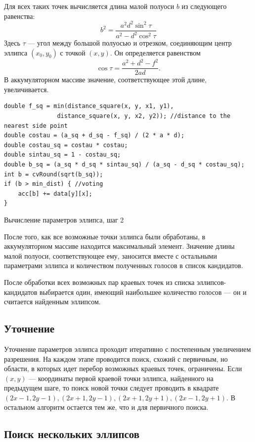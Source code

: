 Для всех таких точек вычисляется длина малой полуоси \(b\) из следующего равенства:
$$b^2 = \frac{a^2d^2\sin^2\tau}{a^2-d^2\cos^2\tau}$$
Здесь \(\tau\) --- угол между большой полуосью и отрезком, соединяющим центр эллипса \((x_0, y_0)\) с точкой \((x, y)\). Он определяется равенством
$$\cos\tau = \frac{a^2 + d^2 - f^2}{2ad}.$$
В аккумуляторном массиве значение, соответствующее этой длине, увеличивается.
\begin{ListingEnv}[H]
\begin{lstlisting}
double f_sq = min(distance_square(x, y, x1, y1),
               distance_square(x, y, x2, y2)); //distance to the nearest side point
double costau = (a_sq + d_sq - f_sq) / (2 * a * d);
double costau_sq = costau * costau;
double sintau_sq = 1 - costau_sq;
double b_sq = (a_sq * d_sq * sintau_sq) / (a_sq - d_sq * costau_sq);
int b = cvRound(sqrt(b_sq));
if (b > min_dist) { //voting
    acc[b] += data[y][x];
}
\end{lstlisting}
\caption{Вычисление параметров эллипса, шаг 2}
\label{list:minoraxis}
\end{ListingEnv}

После того, как все возможные точки эллипса были обработаны, в аккумуляторном массиве находится максимальный элемент. 
Значение длины малой полуоси, соответствующее ему, заносится вместе с остальными параметрами эллипса и количеством полученных голосов в список кандидатов.

После обработки всех возможных пар краевых точек из списка эллипсов-кандидатов выбирается один, имеющий наибольшее количество голосов --- он и считается найденным эллипсом.

\subsection{Уточнение}
Уточнение параметров эллипса проходит итеративно с постепенным увеличением разрешения.
На каждом этапе проводится поиск, схожий с первичным, но области, в которых идет перебор возможных краевых точек, ограничены.
Если \((x, y)\) --- координаты первой краевой точки эллипса, найденного на предыдущем шаге, то поиск новой точки следует 
проводить в квадрате \((2x - 1, 2y - 1), (2x + 1, 2y - 1), (2x + 1, 2y + 1), (2x - 1, 2y + 1)\). В остальном алгоритм остается тем же, что и для первичного поиска.

\subsection{Поиск нескольких эллипсов}

